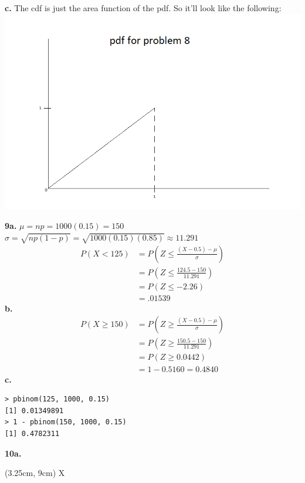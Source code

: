 \documentclass[12pt]{report}
\begin{document}
\noindent \textbf{c.} The cdf is just the area function of the pdf. So it'll look like the following:\\
\includegraphics[scale = 1]{hw3_8c}

\noindent \textbf{9a.} $\mu = np = 1000(0.15) = 150$\\
$\sigma = \sqrt{np(1-p)} = \sqrt{1000(0.15)(0.85)} \approx11.291$
\begin{align*}
P(X < 125) &= P\left(Z \leq \frac{(X-0.5) - \mu}{\sigma}\right)\\
&= P\left(Z \leq \frac{124.5 - 150}{11.291}\right)\\
&= P(Z \leq -2.26)\\
&= \boxed{.01539}
\end{align*}
\noindent \textbf{b.} 
\begin{align*}
P(X \geq 150) &= P\left(Z \geq \frac{(X - 0.5)-\mu}{\sigma}\right)\\
&= P\left(Z \geq \frac{150.5 - 150}{11.291}\right)\\
&= P(Z \geq 0.0442)\\
&= 1 - 0.5160 = \boxed{0.4840}
\end{align*}
\noindent \textbf{c.} 
\begin{verbatim}
> pbinom(125, 1000, 0.15)
[1] 0.01349891
> 1 - pbinom(150, 1000, 0.15)
[1] 0.4782311
\end{verbatim}

\noindent \textbf{10a.}

\begin{textblock*}{1cm}(3.25cm, 9cm)
	X
\end{textblock*}
\end{document}
